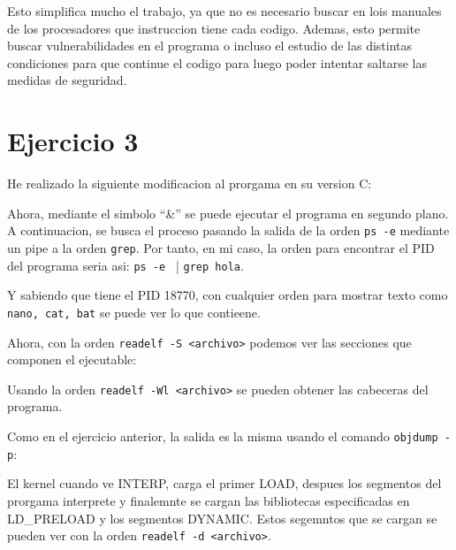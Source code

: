 \documentclass{article}
\begin{document}
Esto simplifica mucho el trabajo, ya que no es necesario buscar en lois manuales de los procesadores que instruccion tiene cada codigo. Ademas, esto permite buscar vulnerabilidades en el programa o incluso el estudio de las distintas condiciones para que continue el codigo para luego poder intentar saltarse las medidas de seguridad.


\section*{Ejercicio 3}

He realizado la siguiente modificacion al prorgama en su version C:




Ahora, mediante el simbolo ``\&'' se puede ejecutar el programa en segundo plano. A continuacion, se busca el proceso pasando la salida de la orden \verb|ps -e| mediante un pipe a la orden \verb|grep|. Por tanto, en mi caso, la orden para encontrar el PID del programa seria asi: \verb|ps -e | | \verb|grep hola|.


Y sabiendo que tiene el PID 18770, con cualquier orden para mostrar texto como \verb|nano, cat, bat| se puede ver lo que contieene.


Ahora, con la orden \verb|readelf -S <archivo>| podemos ver las secciones que componen el ejecutable:


Usando la orden \verb|readelf -Wl <archivo>| se pueden obtener las cabeceras del programa.


Como en el ejercicio anterior, la salida es la misma usando el comando \verb|objdump -p|:



El kernel cuando ve INTERP, carga el primer LOAD, despues los segmentos del prorgama interprete y finalemnte se cargan las bibliotecas especificadas en LD\_PRELOAD y los segmentos DYNAMIC. Estos segemntos que se cargan se pueden ver con la orden \verb|readelf -d <archivo>|.

\end{document}
